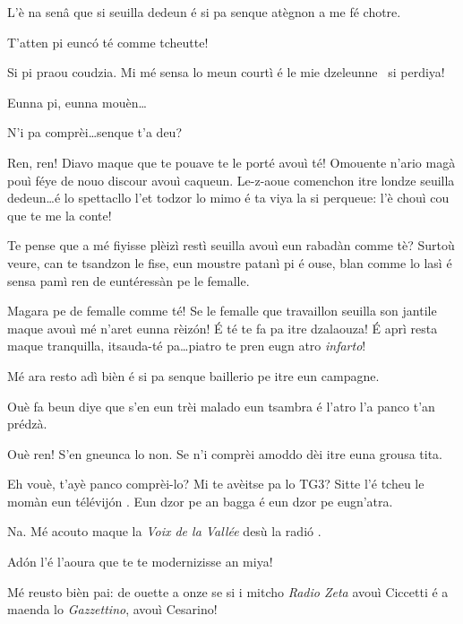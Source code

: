 \begin{drama}
\Gerominespeaks {} L’è na senâ que si seuilla dedeun é si pa senque atègnon a me fé chotre.

\Casimirspeaks T’atten pi eunc\'o té comme tcheutte!

\Gerominespeaks Si pi praou coudzia. Mi mé sensa lo meun courtì é le mie dzeleunne \gallina\ si perdiya!

\Casimirspeaks {} Eunna pi, eunna mouèn\ldots

\Gerominespeaks N’i pa comprèi\ldots senque t’a deu?

\Casimirspeaks Ren, ren! Diavo maque que te pouave te le porté avouì té! Omouente n’ario magà pouì féye de nouo discour avouì caqueun. Le-z-aoue comenchon itre londze seuilla dedeun\ldots é lo spettacllo l’et todzor lo mimo  é ta viya la si perqueue: l’è chouì cou que te me la conte!

\Gerominespeaks Te pense que a mé fiyisse plèizì restì seuilla avouì eun rabadàn comme tè? Surtoù veure, can te tsandzon le fise, eun moustre patanì pi é ouse, blan comme lo lasì é sensa pamì ren de euntéressàn pe le femalle.

\Casimirspeaks Magara pe de femalle comme té! Se le femalle que travaillon seuilla son jantile maque avouì mé n’aret eunna rèizón! \'E té te fa pa itre dzalaouza! \'E aprì resta maque tranquilla, itsauda-té pa\ldots piatro te pren eugn atro \textit{infarto}!

\Gerominespeaks Mé ara resto adì bièn é si pa senque baillerio pe itre eun campagne.

\Casimirspeaks Ouè fa beun diye que s’en eun trèi malado eun tsambra é l’atro  l’a panco t’an prédzà.

\Gerominespeaks Ouè ren! S’en gneunca lo non. Se n'i comprèi a\-mod\-do dèi itre euna grousa tita.

\Casimirspeaks Eh vouè, t’ayè panco comprèi-lo? Mi te avèitse pa lo TG3? Sitte l'é tcheu le momàn eun télévij\'on \tv . Eun dzor pe an bagga é eun dzor pe eugn'atra.

\Gerominespeaks Na. Mé acouto maque la \textit{Voix de la Vallée} desù la radi\'o \radio .

\Casimirspeaks Ad\'on l’é l’aoura que te te modernizisse an miya!

\Gerominespeaks Mé reusto bièn pai: de ouette a onze se si i mitcho \textit{Radio Zeta} avouì Ciccetti é a maenda lo \textit{Gazzettino}, avouì Cesarino!


\end{drama}
